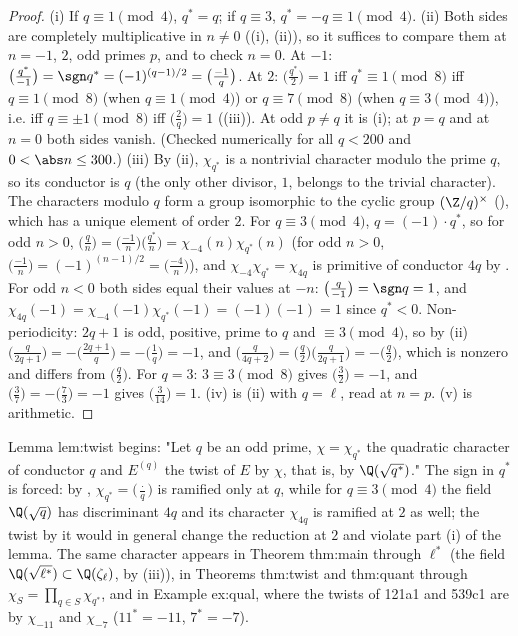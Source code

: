 \begin{proof}
(i) If $q\equiv1\pmod4$, $q^*=q$; if $q\equiv3$, $q^*=-q\equiv1\pmod4$. (ii) Both sides are completely multiplicative in $n\ne0$
((i), (ii)), so it suffices to compare them at $n=-1$, $2$, odd primes $p$, and to check $n=0$. At $-1$:
$\bigl(\frac{q^*}{-1}\bigr)=\sgn q^*=(-1)^{(q-1)/2}=\bigl(\frac{-1}q\bigr)$. At $2$: $\bigl(\frac{q^*}2\bigr)=1$ iff $q^*\equiv1\pmod8$ iff $q\equiv1\pmod8$ (when $q\equiv1\pmod4$) or $q\equiv7\pmod8$ (when
$q\equiv3\pmod4$), i.e. iff $q\equiv\pm1\pmod8$ iff $\bigl(\frac2q\bigr)=1$ ((iii)). At odd $p\ne q$ it is (i); at $p=q$ and at $n=0$
both sides vanish. (Checked numerically for all $q<200$ and $0<\abs n\le300$.)
(iii) By (ii), $\chi_{q^*}$ is a nontrivial character modulo the prime $q$, so its conductor is $q$ (the only other divisor, $1$, belongs to the
trivial character). The characters modulo $q$ form a group isomorphic to the cyclic group $(\Z/q)^\times$ (), which has
a unique element of order $2$. For $q\equiv3\pmod4$, $q=(-1)\cdot q^*$, so for odd $n>0$, $\bigl(\frac qn\bigr)=\bigl(\frac{-1}n\bigr)\bigl(\frac{q^*}n\bigr)=\chi_{-4}(n)\chi_{q^*}(n)$ (for odd $n>0$,
$\bigl(\frac{-1}n\bigr)=(-1)^{(n-1)/2}=\bigl(\frac{-4}n\bigr)$), and $\chi_{-4}\chi_{q^*}=\chi_{4q}$ is primitive of conductor $4q$ by . For odd $n<0$ both sides equal their
values at $-n$: $\bigl(\frac q{-1}\bigr)=\sgn q=1$, and $\chi_{4q}(-1)=\chi_{-4}(-1)\chi_{q^*}(-1)=(-1)(-1)=1$ since $q^*<0$. Non-periodicity: $2q+1$ is odd, positive,
prime to $q$ and $\equiv3\pmod4$, so by (ii) $\bigl(\frac q{2q+1}\bigr)=-\bigl(\frac{2q+1}q\bigr)=-\bigl(\frac1q\bigr)=-1$, and
$\bigl(\frac q{4q+2}\bigr)=\bigl(\frac q2\bigr)\bigl(\frac q{2q+1}\bigr)=-\bigl(\frac q2\bigr)$, which is nonzero and differs from $\bigl(\frac q2\bigr)$. For $q=3$: $3\equiv3\pmod8$ gives
$\bigl(\frac32\bigr)=-1$, and $\bigl(\frac37\bigr)=-\bigl(\frac73\bigr)=-1$ gives $\bigl(\frac3{14}\bigr)=1$.
(iv) is (ii) with $q=\ell$, read at $n=p$. (v) is arithmetic.
\end{proof}

\begin{paperlink}\label{pl:rings:twist}
Lemma lem:twist begins: "Let $q$ be an odd prime, $\chi=\chi_{q^*}$ the quadratic character of conductor $q$ and $E^{(q)}$ the twist of $E$ by $\chi$, that
is, by $\Q(\sqrt{q^*})$." The sign in $q^*$ is forced: by , $\chi_{q^*}=\bigl(\frac\cdot q\bigr)$ is ramified only at $q$, while for $q\equiv3\pmod4$ the
field $\Q(\sqrt q)$ has discriminant $4q$ and its character $\chi_{4q}$ is ramified at $2$ as well; the twist by it would in general change the reduction at
$2$ and violate part (i) of the lemma. The same character appears in Theorem thm:main through $\ell^*$ (the field $\Q(\sqrt{\ell^*})\subset\Q(\zeta_\ell)$, by
(iii)), in Theorems thm:twist and thm:quant through $\chi_S=\prod_{q\in S}\chi_{q^*}$, and in Example ex:qual, where
the twists of 121a1 and 539c1 are by $\chi_{-11}$ and $\chi_{-7}$ ($11^*=-11$, $7^*=-7$).
\end{paperlink}

